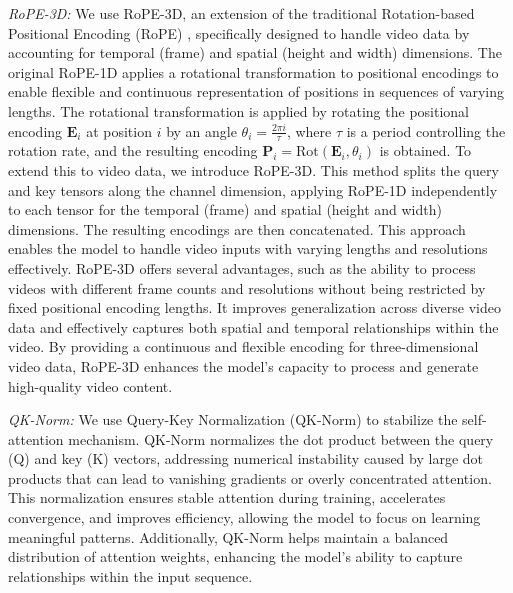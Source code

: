 \textit{RoPE-3D:}
We use RoPE-3D, an extension of the traditional Rotation-based Positional Encoding (RoPE) \cite{su2023roformerenhancedtransformerrotary}, specifically designed to handle video data by accounting for temporal (frame) and spatial (height and width) dimensions. The original RoPE-1D applies a rotational transformation to positional encodings to enable flexible and continuous representation of positions in sequences of varying lengths. The rotational transformation is applied by rotating the positional encoding $\mathbf{E}_i$ at position $i$ by an angle $\theta_i = \frac{2\pi i}{\tau}$, where $\tau$ is a period controlling the rotation rate, and the resulting encoding $\mathbf{P}_i = \text{Rot}(\mathbf{E}_i, \theta_i)$ is obtained. To extend this to video data, we introduce RoPE-3D. This method splits the query and key tensors along the channel dimension, applying RoPE-1D independently to each tensor for the temporal (frame) and spatial (height and width) dimensions. The resulting encodings are then concatenated. This approach enables the model to handle video inputs with varying lengths and resolutions effectively. RoPE-3D offers several advantages, such as the ability to process videos with different frame counts and resolutions without being restricted by fixed positional encoding lengths. It improves generalization across diverse video data and effectively captures both spatial and temporal relationships within the video. By providing a continuous and flexible encoding for three-dimensional video data, RoPE-3D enhances the model’s capacity to process and generate high-quality video content.


\textit{QK-Norm:}
We use Query-Key Normalization (QK-Norm) to stabilize the self-attention mechanism. QK-Norm normalizes the dot product between the query (Q) and key (K) vectors, addressing numerical instability caused by large dot products that can lead to vanishing gradients or overly concentrated attention. This normalization ensures stable attention during training, accelerates convergence, and improves efficiency, allowing the model to focus on learning meaningful patterns. Additionally, QK-Norm helps maintain a balanced distribution of attention weights, enhancing the model's ability to capture relationships within the input sequence.


